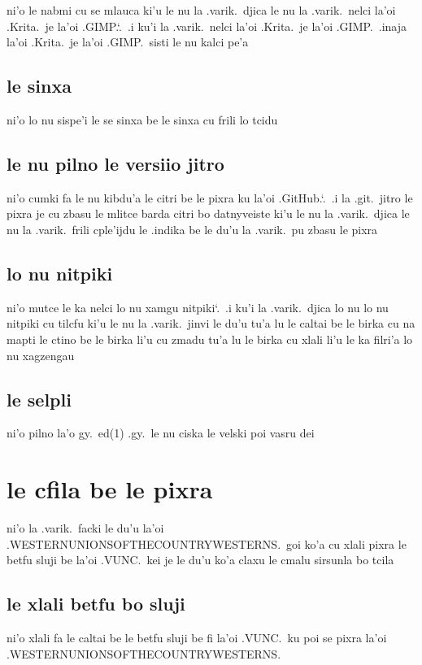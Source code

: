 \documentclass{report}
\newcommand\sds{\spacefactor\sfcode`.\ \space}
\begin{document}
ni'o le nabmi cu se mlauca ki'u le nu la .varik.\ djica le nu la .varik.\ nelci la'oi .Krita.\ je la'oi .GIMP.\sds  .i ku'i la .varik.\ nelci la'oi .Krita.\ je la'oi .GIMP.\ .inaja la'oi .Krita.\ je la'oi .GIMP.\ sisti le nu kalci pe'a

\subsection{le sinxa}
ni'o lo nu sispe'i le se sinxa be le sinxa cu frili lo tcidu

\subsection{le nu pilno le versiio jitro}
ni'o cumki fa le nu kibdu'a le citri be le pixra ku la'oi .GitHub.\sds  .i la .git.\ jitro le pixra je cu zbasu le mlitce barda citri bo datnyveiste ki'u le nu la .varik.\ djica le nu la .varik.\ frili cple'ijdu le .indika be le du'u la .varik.\ pu zbasu le pixra

\subsection{lo nu nitpiki}
ni'o mutce le ka nelci lo nu xamgu nitpiki\sds  .i ku'i la .varik.\ djica lo nu lo nu nitpiki cu tilcfu ki'u le nu la .varik.\ jinvi le du'u tu'a lu le caltai be le birka cu na mapti le ctino be le birka li'u cu zmadu tu'a lu le birka cu xlali li'u le ka filri'a lo nu xagzengau

\subsection{le selpli}
ni'o pilno la'o gy.\ ed(1) .gy.\ le nu ciska le velski poi vasru dei

\section{le cfila be le pixra}
ni'o la .varik.\ facki le du'u la'oi .WESTERNUNIONSOFTHECOUNTRYWESTERNS.\ goi ko'a cu xlali pixra le betfu sluji be la'oi .VUNC.\ kei je le du'u ko'a claxu le cmalu sirsunla bo tcila

\subsection{le xlali betfu bo sluji}
ni'o xlali fa le caltai be le betfu sluji be fi la'oi .VUNC.\ ku poi se pixra la'oi .WESTERNUNIONSOFTHECOUNTRYWESTERNS.
\end{document}
